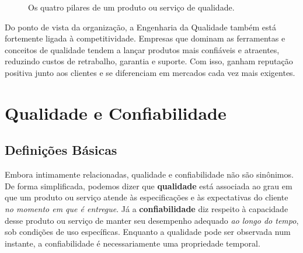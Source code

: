 \documentclass[12pt,a4paper]{report}
\begin{document}
\begin{figure}[h]
    \centering
    \caption{Os quatro pilares de um produto ou serviço de qualidade.}
\end{figure}

Do ponto de vista da organização, a Engenharia da Qualidade também está
fortemente ligada à competitividade. Empresas que dominam as ferramentas e
conceitos de qualidade tendem a lançar produtos mais confiáveis e atraentes,
reduzindo custos de retrabalho, garantia e suporte. Com isso, ganham reputação
positiva junto aos clientes e se diferenciam em mercados cada vez mais
exigentes.

\section{Qualidade e Confiabilidade}

\subsection{Definições Básicas}

Embora intimamente relacionadas, qualidade e confiabilidade não são sinônimos.
De forma simplificada, podemos dizer que \textbf{qualidade} está associada ao
grau em que um produto ou serviço atende às especificações e às expectativas
do cliente \emph{no momento em que é entregue}. Já a \textbf{confiabilidade}
diz respeito à capacidade desse produto ou serviço de manter seu desempenho
adequado \emph{ao longo do tempo}, sob condições de uso específicas. Enquanto
a qualidade pode ser observada num instante, a confiabilidade é necessariamente
uma propriedade temporal.
\end{document}
